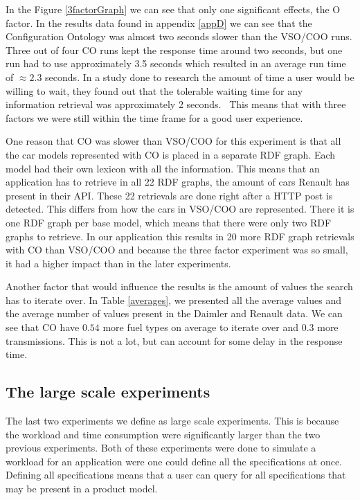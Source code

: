 \documentclass{llncs}
\begin{document}
In the Figure \vref{3factorGraph} we can see that only one significant
effects, the O factor. In the results data found in appendix
\ref{appD} we can see that the Configuration Ontology was almost two
seconds slower than the VSO/COO runs.  Three out of four CO runs kept
the response time around two seconds, but one run had to use
approximately 3.5 seconds which resulted in an average run time of
$\approx2.3$ seconds.  In a study done to research the amount of time
a user would be willing to wait, they found out that the tolerable
waiting time for any information retrieval was approximately 2
seconds.~\cite{waitTime} This means that with three factors we were
still within the time frame for a good user experience.

One reason that CO was slower than VSO/COO for this experiment is that
all the car models represented with CO is placed in a separate RDF
graph. Each model had their own lexicon with all the information.
This means that an application has to retrieve in all 22 RDF graphs,
the amount of cars Renault has present in their API. These 22
retrievals are done right after a HTTP post is detected. This differs
from how the cars in VSO/COO are represented. There it is one RDF
graph per base model, which means that there were only two RDF graphs
to retrieve.  In our application this results in 20 more RDF graph
retrievals with CO than VSO/COO and because the three factor
experiment was so small, it had a higher impact than in the later
experiments.

Another factor that would influence the results is the amount of
values the search has to iterate over.  In Table \vref{averages}, we
presented all the average values and the average number of values
present in the Daimler and Renault data. We can see that CO have
$0.54$ more fuel types on average to iterate over and $0.3$ more
transmissions. This is not a lot, but can account for some delay in
the response time.

\subsection{The large scale experiments}
The last two experiments we define as large scale experiments. This is
because the workload and time consumption were significantly larger
than the two previous experiments. Both of these experiments were done
to simulate a workload for an application were one could define all
the specifications at once. Defining all specifications means that a
user can query for all specifications that may be present in a product
model.
\end{document}
